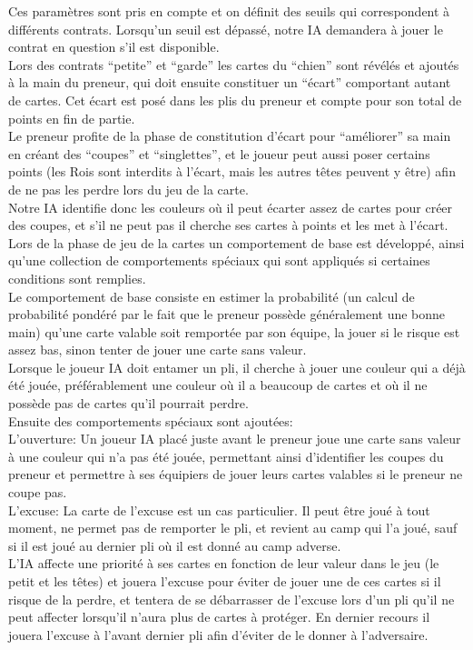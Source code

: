 \documentclass[a4paper]{report}
\begin{document}
Ces paramètres sont pris en compte et on définit des seuils qui correspondent à différents contrats. Lorsqu’un seuil est dépassé, notre IA demandera à jouer le contrat en question s’il est disponible.\\


Lors des contrats “petite” et “garde” les cartes du “chien” sont révélés et ajoutés à la main du preneur, qui doit ensuite constituer un “écart” comportant autant de cartes. Cet écart est posé dans les plis du preneur et compte pour son total de points en fin de partie.\\

Le preneur profite de la phase de constitution d’écart pour “améliorer” sa main en créant des “coupes” et “singlettes”, et le joueur peut aussi poser certains points (les Rois sont interdits à l’écart, mais les autres têtes peuvent y être) afin de ne pas les perdre lors du jeu de la carte.\\

Notre IA identifie donc les couleurs où il peut écarter assez de cartes pour créer des coupes, et s’il ne peut pas il cherche ses cartes à points et les met à l’écart.\\


Lors de la phase de jeu de la cartes un comportement de base est développé, ainsi qu’une collection de comportements spéciaux qui sont appliqués si certaines conditions sont remplies.\\

Le comportement de base consiste en estimer la probabilité (un calcul de probabilité pondéré par le fait que le preneur possède généralement une bonne main) qu’une carte valable soit remportée par son équipe, la jouer si le risque est assez bas, sinon tenter de jouer une carte sans valeur.\\
Lorsque le joueur IA doit entamer un pli, il cherche à jouer une couleur qui a déjà été jouée, préférablement une couleur où il a beaucoup de cartes et où il ne possède pas de cartes qu’il pourrait perdre.\\

Ensuite des comportements spéciaux sont ajoutées:\\
L’ouverture: Un joueur IA placé juste avant le preneur joue une carte sans valeur à une couleur qui n’a pas été jouée, permettant ainsi d’identifier les coupes du preneur et permettre à ses équipiers de jouer leurs cartes valables si le preneur ne coupe pas.\\

L’excuse: La carte de l’excuse est un cas particulier. Il peut être joué à tout moment, ne permet pas de remporter le pli, et revient au camp qui l’a joué, sauf si il est joué au dernier pli où il est donné au camp adverse.\\
L’IA affecte une priorité à ses cartes en fonction de leur valeur dans le jeu (le petit et les têtes) et jouera l’excuse pour éviter de jouer une de ces cartes si il risque de la perdre, et tentera de se débarrasser de l’excuse lors d’un pli qu’il ne peut affecter lorsqu’il n’aura plus de cartes à protéger. En dernier recours il jouera l’excuse à l’avant dernier pli afin d’éviter de le donner à l’adversaire.\\
\end{document}
